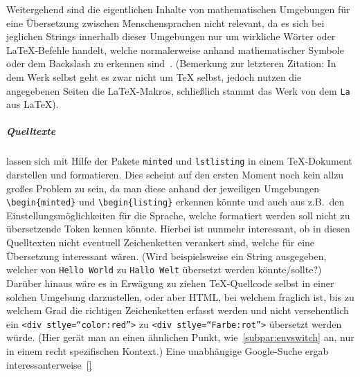 Weitergehend sind die eigentlichen Inhalte von mathematischen Umgebungen für eine Übersetzung zwischen Menschensprachen nicht relevant, da es sich bei jeglichen Strings innerhalb dieser Umgebungen nur um wirkliche Wörter oder \LaTeX{}-Befehle handelt, welche normalerweise anhand mathematischer Symbole oder dem Backslash zu erkennen sind~\citep{specifyingSystems:leslieLamport:asciiOfMathTypesetting}.
(Bemerkung zur letzteren Zitation: In dem Werk selbst geht es zwar nicht um \TeX{} selbst, jedoch nutzen die angegebenen Seiten die \LaTeX{}-Makros, schließlich stammt das Werk von dem \texttt{La} aus \LaTeX{}).

\subparagraph*{Quelltexte} lassen sich mit Hilfe der Pakete \texttt{minted} und \texttt{lstlisting} in einem \TeX{}-Dokument darstellen und formatieren. Dies scheint auf den ersten Moment noch kein allzu großes Problem zu sein, da man diese anhand der jeweiligen Umgebungen \verb|\begin{minted}| und \verb|\begin{listing}| erkennen könnte und auch aus z.B.\ den Einstellungsmöglichkeiten für die Sprache, welche formatiert werden soll nicht zu übersetzende Token kennen könnte. Hierbei ist nunmehr interessant, ob in diesen Quelltexten nicht eventuell Zeichenketten verankert sind, welche für eine Übersetzung interessant wären. (Wird beispielsweise ein String ausgegeben, welcher von \texttt{Hello World} zu \texttt{Hallo Welt} übersetzt werden könnte/sollte?) Darüber hinaus wäre es in Erwägung zu ziehen \TeX{}-Quellcode selbst in einer solchen Umgebung darzustellen, oder aber HTML, bei welchem fraglich ist, bis zu welchem Grad die richtigen Zeichenketten erfasst werden und nicht versehentlich ein \texttt{<div stlye=\enquote{color:red}>} zu \texttt{<div stlye=\enquote{Farbe:rot}>} übersetzt werden würde. (Hier gerät man an einen ähnlichen Punkt, wie~\ref{subpar:envswitch} an, nur in einem recht spezifischen Kontext.) Eine unabhängige Google-Suche ergab interessanterweise~\ref{}%


